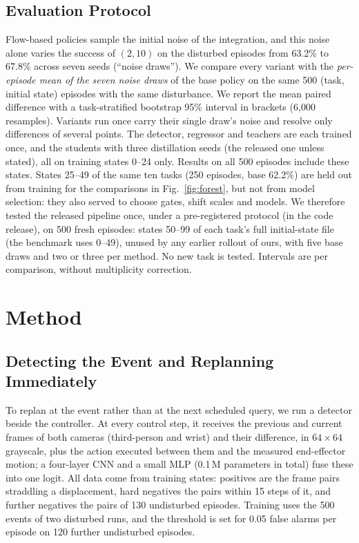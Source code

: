 \documentclass[conference,a4paper]{IEEEtran}
\begin{document}
\subsection{Evaluation Protocol}\label{sec:protocol}
Flow-based policies sample the initial noise of the integration, and this
noise alone varies the success of $(2,10)$ on the disturbed episodes from 63.2\% to 67.8\% across seven seeds (``noise draws''). We compare every variant with the \emph{per-episode mean of the seven
noise draws} of the base policy on the same 500 (task, initial state) episodes with the same disturbance. We report the mean
paired difference with a task-stratified bootstrap 95\% interval in brackets (6,000
resamples). Variants run once carry their single draw's noise and resolve only
differences of several points. The detector, regressor and teachers are each trained once, and the students with three distillation seeds (the released one unless stated), all on training states 0--24 only. Results on all 500 episodes include these states. States 25--49 of the same ten tasks (250 episodes, base 62.2\%) are held out from training for the comparisons in Fig.~\ref{fig:forest}, but not from model selection: they also served to choose gates, shift scales and models. We therefore tested the released pipeline once, under a pre-registered protocol (in the code release), on 500 fresh episodes: states 50\nobreakdash--99 of each task's full initial-state file (the benchmark uses 0--49), unused by any earlier rollout of ours, with five base draws and two or three per method. No new task is tested. Intervals are per comparison, without multiplicity correction.

\section{Method}\label{sec:method}

\subsection{Detecting the Event and Replanning Immediately}
To replan at the event rather than at the next scheduled query, we run a detector beside the controller. At every control step, it receives the previous and current frames of both cameras (third-person and wrist) and their difference, in $64\times64$ grayscale, plus the action executed between them and the measured end-effector motion; a four-layer CNN and a small MLP (0.1\,M parameters in total) fuse these into one
logit. All data come from training states: positives are the frame pairs straddling a displacement, hard negatives the pairs within 15 steps of it, and further negatives the pairs of 130 undisturbed episodes. Training uses the 500 events of two disturbed runs, and the threshold is set for 0.05 false alarms per episode on 120 further undisturbed episodes.
\end{document}
